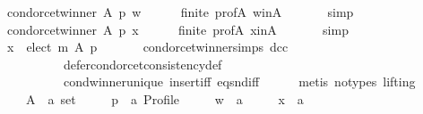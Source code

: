\begin{isabellebody}
\ {\isachardoublequoteopen}condorcet{\isacharunderscore}{\kern0pt}winner\ A\ p\ w{\isachardoublequoteclose}\isanewline
\ \ \ \ \isamarkupfalse%
\ finite\ prof{\isacharunderscore}{\kern0pt}A\ w{\isacharunderscore}{\kern0pt}in{\isacharunderscore}{\kern0pt}A\ {\isachardoublequoteopen}{}{\isachardoublequoteclose}\isanewline
\ \ \ \ \isamarkupfalse%
\ simp\isanewline
\ \ \isamarkupfalse%
\ \isamarkupfalse%
\ {\isachardoublequoteopen}condorcet{\isacharunderscore}{\kern0pt}winner\ A\ p\ x{\isachardoublequoteclose}\isanewline
\ \ \ \ \isamarkupfalse%
\ finite\ prof{\isacharunderscore}{\kern0pt}A\ x{\isacharunderscore}{\kern0pt}in{\isacharunderscore}{\kern0pt}A\ {\isachardoublequoteopen}{}{\isachardoublequoteclose}\isanewline
\ \ \ \ \isamarkupfalse%
\ simp\isanewline
\ \ \isamarkupfalse%
\ \isamarkupfalse%
\ {\isachardoublequoteopen}x\ {\isasymin}\ elect\ m\ A\ p{\isachardoublequoteclose}\isanewline
\ \ \ \ \isamarkupfalse%
\ {\isachardoublequoteopen}{}{\isachardoublequoteclose}\ condorcet{\isacharunderscore}{\kern0pt}winner{\isachardot}{\kern0pt}simps\ dcc\isanewline
\ \ \ \ \ \ \ \ \ \ defer{\isacharunderscore}{\kern0pt}condorcet{\isacharunderscore}{\kern0pt}consistency{\isacharunderscore}{\kern0pt}def\isanewline
\ \ \ \ \ \ \ \ \ \ cond{\isacharunderscore}{\kern0pt}winner{\isacharunderscore}{\kern0pt}unique{}\ insert{\isacharunderscore}{\kern0pt}iff\ eq{\isacharunderscore}{\kern0pt}snd{\isacharunderscore}{\kern0pt}iff\isanewline
\ \ \ \ \isamarkupfalse%
\ {\isacharparenleft}{\kern0pt}metis\ {\isacharparenleft}{\kern0pt}no{\isacharunderscore}{\kern0pt}types{\isacharcomma}{\kern0pt}\ lifting{\isacharparenright}{\kern0pt}{\isacharparenright}{\kern0pt}\isanewline
{}\isamarkupfalse%
\isanewline
\ \ \isamarkupfalse%
\isanewline
\ \ \ \ A\ {\isacharcolon}{\kern0pt}{\isacharcolon}{\kern0pt}\ {\isachardoublequoteopen}{\isacharprime}{\kern0pt}a\ set{\isachardoublequoteclose}\ \isanewline
\ \ \ \ p\ {\isacharcolon}{\kern0pt}{\isacharcolon}{\kern0pt}\ {\isachardoublequoteopen}{\isacharprime}{\kern0pt}a\ Profile{\isachardoublequoteclose}\ \isanewline
\ \ \ \ w\ {\isacharcolon}{\kern0pt}{\isacharcolon}{\kern0pt}\ {\isachardoublequoteopen}{\isacharprime}{\kern0pt}a{\isachardoublequoteclose}\ \isanewline
\ \ \ \ x\ {\isacharcolon}{\kern0pt}{\isacharcolon}{\kern0pt}\ {\isachardoublequoteopen}{\isacharprime}{\kern0pt}a{\isachardoublequoteclose}\isanewline

\end{isabellebody}
